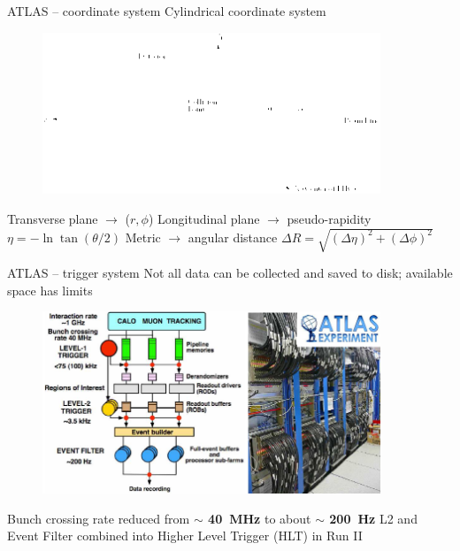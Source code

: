 \documentclass[10pt]{beamer}
\begin{document}
\begin{frame}{ATLAS -- coordinate system}
\centering
Cylindrical coordinate system
\begin{figure}
	\centering
   \includegraphics[width=0.9\textwidth]{figures/Figures_T_Coordinate.png}
	\label{fig:coord}
\end{figure}
\begin{outline}
\1 Transverse plane  $\longrightarrow$ ($r,\phi$) 
\1 Longitudinal plane $\longrightarrow$ pseudo-rapidity $\eta=-\ln\tan(\theta/2)$
\1 Metric $\longrightarrow$ angular distance $\Delta R = \sqrt{(\Delta\eta)^2 + (\Delta\phi)^2}$
\end{outline}
\end{frame}

\begin{frame}{ATLAS -- trigger system}
Not all data can be collected and saved to disk; available space has limits
\begin{figure}
	\centering
   \includegraphics[width=0.9\textwidth]{figures/trigger.png}
\end{figure}
\begin{outline}
\1 Bunch crossing rate reduced from {\bf $\sim$ 40~MHz} to about {\bf $\sim$ 200~Hz}
\1 L2 and Event Filter combined into Higher Level Trigger (HLT) in Run II 
\end{outline}
\end{frame}
\end{document}
